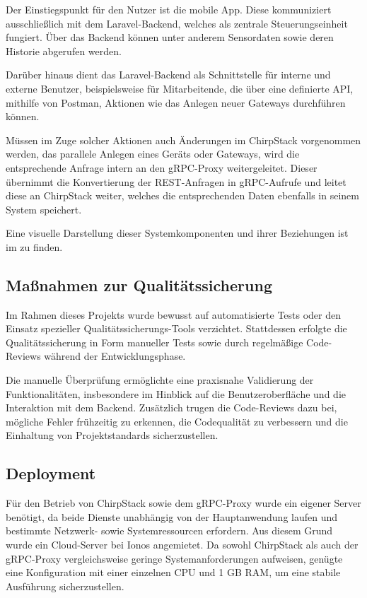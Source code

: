 	Der Einstiegspunkt für den Nutzer ist die mobile App. Diese kommuniziert ausschließlich mit dem Laravel-Backend,
	welches als zentrale Steuerungseinheit fungiert. Über das Backend können unter anderem Sensordaten sowie deren Historie abgerufen werden.

	Darüber hinaus dient das Laravel-Backend als Schnittstelle für interne und externe Benutzer,
	beispielsweise für Mitarbeitende, die über eine definierte API, mithilfe von Postman, Aktionen wie das Anlegen neuer Gateways durchführen können.

	Müssen im Zuge solcher Aktionen auch Änderungen im ChirpStack vorgenommen werden, \zB das parallele Anlegen eines Geräts oder Gateways,
	wird die entsprechende Anfrage intern an den gRPC-Proxy weitergeleitet. Dieser übernimmt die Konvertierung der REST-Anfragen
	in gRPC-Aufrufe und leitet diese an ChirpStack weiter, welches die entsprechenden Daten ebenfalls in seinem System speichert.
	
	Eine visuelle Darstellung dieser Systemkomponenten und ihrer Beziehungen ist im  zu finden.


\subsection{Maßnahmen zur Qualitätssicherung}
\label{sec:Qualitaetssicherung}
	Im Rahmen dieses Projekts wurde bewusst auf automatisierte Tests oder den Einsatz spezieller Qualitätssicherungs-Tools verzichtet.
	Stattdessen erfolgte die Qualitätssicherung in Form manueller Tests sowie durch regelmäßige Code-Reviews während der Entwicklungsphase.

	Die manuelle Überprüfung ermöglichte eine praxisnahe Validierung der Funktionalitäten,
	insbesondere im Hinblick auf die Benutzeroberfläche und die Interaktion mit dem Backend.
	Zusätzlich trugen die Code-Reviews dazu bei, mögliche Fehler frühzeitig zu erkennen,
	die Codequalität zu verbessern und die Einhaltung von Projektstandards sicherzustellen.


\subsection{Deployment}
\label{sec:Deployment}
	Für den Betrieb von ChirpStack sowie dem gRPC-Proxy wurde ein eigener Server benötigt,
	da beide Dienste unabhängig von der Hauptanwendung laufen und bestimmte Netzwerk- sowie Systemressourcen erfordern.
	Aus diesem Grund wurde ein Cloud-Server bei Ionos angemietet.
	Da sowohl ChirpStack als auch der gRPC-Proxy vergleichsweise geringe Systemanforderungen aufweisen,
	genügte eine Konfiguration mit einer einzelnen CPU und 1 GB RAM, um eine stabile Ausführung sicherzustellen.

